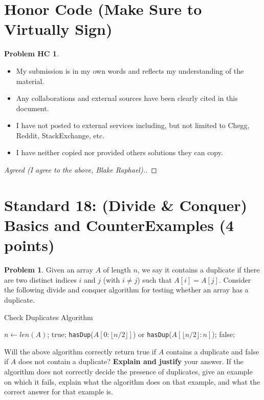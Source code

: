 \documentclass[11pt]{article}
\theoremstyle{definition}
\theoremstyle{definition}
\newtheorem{required}{Problem}
\newtheorem*{requiredHC}{Problem HC}
\theoremstyle{definition}
\begin{document}
\newpage
\section*{Honor Code (Make Sure to Virtually Sign)} \label{HonorCode}
\hypertarget{HonorCode}{}

\begin{requiredHC}
\begin{itemize}
\item My submission is in my own words and reflects my understanding of the material.
\item Any collaborations and external sources have been clearly cited in this document.
\item I have not posted to external services including, but not limited to Chegg, Reddit, StackExchange, etc.
\item I have neither copied nor provided others solutions they can copy.
\end{itemize}

\end{requiredHC}

\begin{proof}[Agreed (I agree to the above, Blake Raphael).]
\end{proof}


\newpage
\setcounter{section}{17}
\section{Standard 18: (Divide \& Conquer) Basics and CounterExamples (4 points)}

\setcounter{required}{17}
\begin{required} 
Given an array $A$ of length $n$, we say it contains a duplicate if there are two distinct indices $i$ and $j$ (with $i \neq j$) such that $A[i]  = A[j]$. Consider the following divide and conquer algorithm for testing whether an array has a duplicate.

\begin{algorithm}
	\caption{Check Duplicates Algorithm}
	\begin{algorithmic}[1]
	  \State $n \gets len(A)$;
		\State \Return true;
		\State \Return \texttt{hasDup}($A[0:\lfloor n/2 \rfloor]$) or \texttt{hasDup}($A[\lfloor n/2 \rfloor:n]$);
	  \Else{}
		\State \Return false;
	  \EndIf
	\EndProcedure
	\end{algorithmic}
\end{algorithm}

Will the above algorithm correctly return true if $A$ contains a duplicate and false if $A$ does not contain a duplicate? \textbf{Explain and justify} your answer. If the algorithm does not correctly decide the presence of duplicates, give an example on which it fails, explain what the algorithm does on that example, and what the correct answer for that example is.
\end{required}
\end{document}
